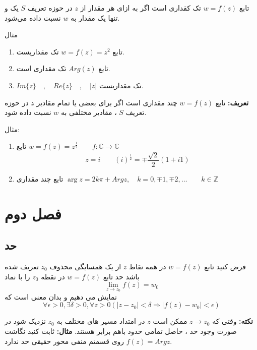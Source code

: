 \documentclass[12pt]{report}
\begin{document}
	 	 	 	 تابع 
	 	 	 	 $w = f(z)$
	 	 	 	 تک کقداری است اگر به ازای هر مقدار از 
	 	 	 	 $z$
	 	 	 	 در حوزه تعریف 
	 	 	 	 $S$
	 	 	 	 یک و تنها یک  مقدار  به 
	 	 	 	 $w$
	 	 	 	 نسبت داده می‌شود.
	 	 	 	 
	 	 	 	 مثال
	 	 	 	 \begin{enumerate}
	 	 	 	 	\item 
	 	 	 	 	تابع
	 	 	 	 	$w=f(z) = z^2$
	 	 	 	 	تک مقداریست.
	 	 	 	 	\item
	 	 	 	 	تابع 
	 	 	 	 	$Arg(z)$
	 	 	 	 	تک مقداری است.
	 	 	 	 	\item
	 	 	 	 	$Im\{z\} \quad, \quad Re\{z\} \quad , \quad |z|$
	 	 	 	 	تک مقداریست.
	 	 	 	 	
	 	 	 	 \end{enumerate}
 	 	 	 \textbf{تعریف:}
 	 	 	 تابع 
 	 	 	 $w = f(z)$
 	 	 	 چند مقداری است اگر برای بعضی یا تمام مقادیر 
 	 	 	 $z$
 	 	 	 در حوزه تعریف
 	 	 	 $S$
 	 	 	 ،
 	 	 	 مقادیر مختلفی به 
 	 	 	 $w$
 	 	 	 نسبت داده شود.
 	 	 	 
 	 	 	 مثال:
 	 	 	 \begin{enumerate}
 	 	 	 	\item 
 	 	 	 	تابع 
 	 	 	 	$w = f(z) = z^{\frac{1}{2}}\qquad f: \mathbb{C} \rightarrow \mathbb{C}$
 	 	 	 	$$z = i \qquad (i)^{\frac{1}{2}} = \mp \frac{\sqrt{2}}{2}(1 + i1)$$
 	 	 	 	\item
 	 	 	 	تابع چند مقداری
 	 	 	 	$\arg z  = 2k \pi + Arg z , \quad k= 0, \mp1, \mp 2 , \dots \qquad k \in \mathbb{Z}$
 	 	 	 	
 	 	 	 \end{enumerate}
  	 	 \chapter{فصل دوم}
  	 	 \section{حد}
 	 	 	 
	 	 	 	  فرض کنید تابع 
	 	 	 	  $w = f(z)$
	 	 	 	  در همه نقاط 
	 	 	 	  $z$
	 	 	 	  از یک همسایگی محذوف 
	 	 	 	  $z_0$
	 	 	 	  تعریف شده باشد حد تابع 
	 	 	 	  $w = f(z)$
	 	 	 	  در نقطه 
	 	 	 	  $z_0$
	 	 	 	  را با نماد 
	 	 	 	  $$\lim_{z \to z_0} f(z) = w_0$$
	 	 	 	  نمایش می دهیم و بدان معنی است که 
	 	 	 	  $$\forall \epsilon > 0 , \exists \delta > 0 , \forall z > 0 (|z - z_0| < \delta \Rightarrow |f(z) - w_0| < \epsilon)$$
	 	 	 	  
	 	 	 	  \textbf{نکته:}
	 	 	 	  وقتی که 
	 	 	 	  $z \to z_0$
	 	 	 	  ممکن است 
	 	 	 	  $z$
	 	 	 	  در امتداد مسیر های مختلف به 
	 	 	 	  $z_0$
	 	 	 	  نزدیک شود در صورت وجود حد
	 	 	 	  ،
	 	 	 	  حاصل تمامی حدود باهم برابر هستند.
	 	 	 	  \textbf{مثال:}
	 	 	 	  ثابت کنید نگاشت 
	 	 	 	  $f(z) = Arg z$
	 	 	 	  روی قسمتم منفی محور حقیقی حد ندارد.
	 	 	 	  
\end{document}
